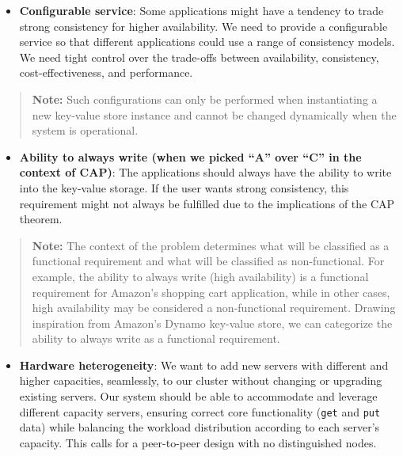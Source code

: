 \begin{itemize}
\item
\protect{}\label{pRfuKVAGSDUZlL7waSmnY}
\textbf{Configurable service}: Some applications might have a tendency to trade strong consistency for higher availability. We need to provide a configurable service so that different applications could use a range of consistency models. We need tight control over the trade-offs between availability, consistency, cost-effectiveness, and performance.
\end{itemize}
\begin{quote}
\textbf{Note:} Such configurations can only be performed when instantiating a new key-value store instance and cannot be changed dynamically when the system is operational.
\end{quote}
\begin{itemize}
\item
\protect{}\label{dtEJxr50s6C2K6ripTP-M}
\textbf{Ability to always write (when we picked ``A'' over ``C'' in the context of CAP)}: The applications should always have the ability to write into the key-value storage. If the user wants strong consistency, this requirement might not always be fulfilled due to the implications of the CAP theorem.
\end{itemize}
\begin{quote}
\textbf{Note:} The context of the problem determines what will be classified as a functional requirement and what will be classified as non-functional. For example, the ability to always write (high availability) is a functional requirement for Amazon's shopping cart application, while in other cases, high availability may be considered a non-functional requirement. Drawing inspiration from Amazon's Dynamo key-value store, we can categorize the ability to always write as a functional requirement.
\end{quote}
\begin{itemize}
\item
\protect{}\label{r1EVP-bjuo1uq43aQZQtD}
\textbf{Hardware heterogeneity}: We want to add new servers with different and higher capacities, seamlessly, to our cluster without changing or upgrading existing servers. Our system should be able to accommodate and leverage different capacity servers, ensuring correct core functionality (\texttt{get} and \texttt{put} data) while balancing the workload distribution according to each server's capacity. This calls for a peer-to-peer design with no distinguished nodes.
\end{itemize}


